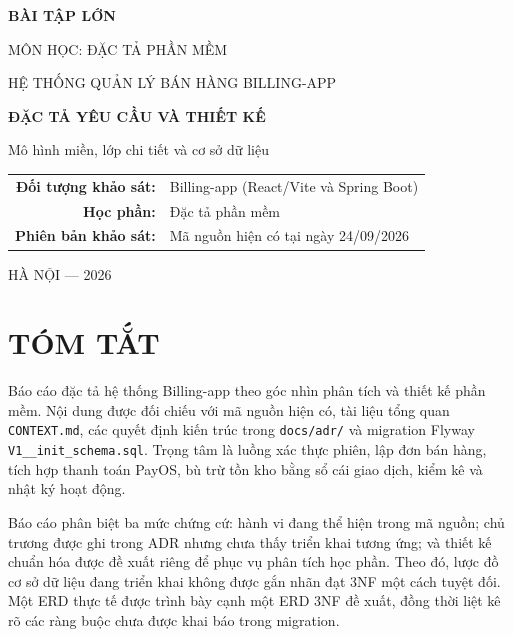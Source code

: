 \documentclass[12pt,a4paper,oneside]{report}
\begin{document}
\begin{titlepage}
\thispagestyle{empty}
\begin{center}
\vspace*{12mm}
{\Large\bfseries BÀI TẬP LỚN}\par
\vspace{3mm}
{\large MÔN HỌC: ĐẶC TẢ PHẦN MỀM}\par
\vspace{21mm}
{\large HỆ THỐNG QUẢN LÝ BÁN HÀNG BILLING-APP}\par
\vspace{5mm}
{\Huge\bfseries\color{navy} ĐẶC TẢ YÊU CẦU VÀ THIẾT KẾ}\par
\vspace{3mm}
{\Large Mô hình miền, lớp chi tiết và cơ sở dữ liệu}\par
\vspace{18mm}
\par
\vspace{14mm}
\begin{tabular}{rl}
\textbf{Đối tượng khảo sát:} & Billing-app (React/Vite và Spring Boot)\\[4mm]
\textbf{Học phần:} & Đặc tả phần mềm\\[4mm]
\textbf{Phiên bản khảo sát:} & Mã nguồn hiện có tại ngày 24/09/2026\\
\end{tabular}
\vfill
{\large HÀ NỘI — 2026}\par
\end{center}
\end{titlepage}

\chapter*{TÓM TẮT}
Báo cáo đặc tả hệ thống Billing-app theo góc nhìn phân tích và thiết kế phần mềm. Nội dung được đối chiếu với mã nguồn hiện có, tài liệu tổng quan \texttt{CONTEXT.md}, các quyết định kiến trúc trong \texttt{docs/adr/} và migration Flyway \texttt{V1\_\_init\_schema.sql}. Trọng tâm là luồng xác thực phiên, lập đơn bán hàng, tích hợp thanh toán PayOS, bù trừ tồn kho bằng sổ cái giao dịch, kiểm kê và nhật ký hoạt động.

Báo cáo phân biệt ba mức chứng cứ: hành vi đang thể hiện trong mã nguồn; chủ trương được ghi trong ADR nhưng chưa thấy triển khai tương ứng; và thiết kế chuẩn hóa được đề xuất riêng để phục vụ phân tích học phần. Theo đó, lược đồ cơ sở dữ liệu đang triển khai không được gắn nhãn đạt 3NF một cách tuyệt đối. Một ERD thực tế được trình bày cạnh một ERD 3NF đề xuất, đồng thời liệt kê rõ các ràng buộc chưa được khai báo trong migration.
\end{document}
